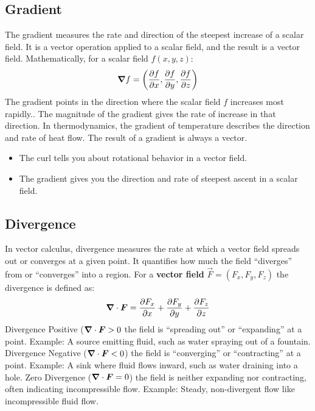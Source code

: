 \subsection{Gradient}\label{subsec:gradient}
The gradient measures the rate and direction of the steepest increase of a scalar field. It is a vector operation applied to a scalar field, and the result is a vector field. Mathematically, for a scalar field $f(x,y,z)$:
\begin{equation}
	\bm{\nabla} f=\left(\frac{\partial f}{\partial x}, \frac{\partial f}{\partial y}, \frac{\partial f}{\partial z}\right)
	\label{eq:gradient-def}
\end{equation}
The gradient points in the direction where the scalar field $f$ increases most rapidly.. The magnitude of the gradient gives the rate of increase in that direction. In thermodynamics, the gradient of temperature describes the direction and rate of heat flow. The result of a gradient is always a vector.
\begin{itemize}
	\item The curl tells you about rotational behavior in a vector field.
	\item The gradient gives you the direction and rate of steepest ascent in a scalar field.
\end{itemize}

\subsection{Divergence}\label{subsec:divergence}
In vector calculus, divergence measures the rate at which a vector field spreads out or converges at a given point.
It quantifies how much the field ``diverges'' from or ``converges'' into a region.
For a \textbf{vector field} $\vec{F}=(F_x,F_y,F_z)$ the divergence is defined as:
\begin{equation}
	\diverg{\vec{F}}=\frac{\partial F_x}{\partial x}+\frac{\partial F_y}{\partial y}+\frac{\partial F_z}{\partial z}
	\label{eq:divergence-def}
\end{equation}
Divergence Positive ($\diverg{\vec{F}}>0$ the field is ``spreading out'' or ``expanding'' at a point.
Example: A source emitting fluid, such as water spraying out of a fountain.
Divergence Negative ($\diverg{\vec{F}}<0$) the field is ``converging'' or ``contracting'' at a point.
Example: A sink where fluid flows inward, such as water draining into a hole.
Zero Divergence ($\diverg{\vec{F}}=0$) the field is neither expanding nor contracting, often indicating incompressible flow.
Example: Steady, non-divergent flow like incompressible fluid flow.

